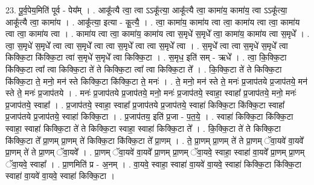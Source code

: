 \documentclass[17pt]{extarticle}
\begin{document}
23. पू॒र्व॒पेय॒मिति॑ पूर्व - पेय᳚म् । . आकू᳚त्यै त्वा॒ त्वा ऽऽकू᳚त्या॒ आकू᳚त्यै त्वा॒ कामा॑य॒ कामा॑य॒ त्वा ऽऽकू᳚त्या॒ आकू᳚त्यै त्वा॒ कामा॑य । . आकू᳚त्या॒ इत्या - कू॒त्यै॒ । . त्वा॒ कामा॑य॒ कामा॑य त्वा त्वा॒ कामा॑य त्वा त्वा॒ कामा॑य त्वा त्वा॒ कामा॑य त्वा । . कामा॑य त्वा त्वा॒ कामा॑य॒ कामा॑य त्वा स॒मृधे॑ स॒मृधे᳚ त्वा॒ कामा॑य॒ कामा॑य त्वा स॒मृधे᳚ । . त्वा॒ स॒मृधे॑ स॒मृधे᳚ त्वा त्वा स॒मृधे᳚ त्वा त्वा स॒मृधे᳚ त्वा त्वा स॒मृधे᳚ त्वा । . स॒मृधे᳚ त्वा त्वा स॒मृधे॑ स॒मृधे᳚ त्वा किक्कि॒टा कि॑क्कि॒टा त्वा॑ स॒मृधे॑ स॒मृधे᳚ त्वा किक्कि॒टा । . स॒मृध॒ इति॑ सम् - ऋधे᳚ । . त्वा॒ कि॒क्कि॒टा कि॑क्कि॒टा त्वा᳚ त्वा किक्कि॒टा ते॑ ते किक्कि॒टा त्वा᳚ त्वा किक्कि॒टा ते᳚ । . कि॒क्कि॒टा ते॑ ते किक्कि॒टा कि॑क्कि॒टा ते॒ मनो॒ मन॑ स्ते किक्कि॒टा कि॑क्कि॒टा ते॒ मनः॑ । . ते॒ मनो॒ मन॑ स्ते ते॒ मनः॑ प्र॒जाप॑तये प्र॒जाप॑तये॒ मन॑ स्ते ते॒ मनः॑ प्र॒जाप॑तये । . मनः॑ प्र॒जाप॑तये प्र॒जाप॑तये॒ मनो॒ मनः॑ प्र॒जाप॑तये॒ स्वाहा॒ स्वाहा᳚ प्र॒जाप॑तये॒ मनो॒ मनः॑ प्र॒जाप॑तये॒ स्वाहा᳚ । . प्र॒जाप॑तये॒ स्वाहा॒ स्वाहा᳚ प्र॒जाप॑तये प्र॒जाप॑तये॒ स्वाहा॑ किक्कि॒टा कि॑क्कि॒टा स्वाहा᳚ प्र॒जाप॑तये प्र॒जाप॑तये॒ स्वाहा॑ किक्कि॒टा । . प्र॒जाप॑तय॒ इति॑ प्र॒जा - प॒त॒ये॒ । . स्वाहा॑ किक्कि॒टा कि॑क्कि॒टा स्वाहा॒ स्वाहा॑ किक्कि॒टा ते॑ ते किक्कि॒टा स्वाहा॒ स्वाहा॑ किक्कि॒टा ते᳚ । . कि॒क्कि॒टा ते॑ ते किक्कि॒टा कि॑क्कि॒टा ते᳚ प्रा॒णम् प्रा॒णम् ते॑ किक्कि॒टा कि॑क्कि॒टा ते᳚ प्रा॒णम् । . ते॒ प्रा॒णम् प्रा॒णम् ते॑ ते प्रा॒णम् ॅवा॒यवे॑ वा॒यवे᳚ प्रा॒णम् ते॑ ते प्रा॒णम् ॅवा॒यवे᳚ । . प्रा॒णम् ॅवा॒यवे॑ वा॒यवे᳚ प्रा॒णम् प्रा॒णम् ॅवा॒यवे॒ स्वाहा॒ स्वाहा॑ वा॒यवे᳚ प्रा॒णम् प्रा॒णम् ॅवा॒यवे॒ स्वाहा᳚ । . प्रा॒णमिति॑ प्र - अ॒नम् । . वा॒यवे॒ स्वाहा॒ स्वाहा॑ वा॒यवे॑ वा॒यवे॒ स्वाहा॑ किक्कि॒टा कि॑क्कि॒टा स्वाहा॑ वा॒यवे॑ वा॒यवे॒ स्वाहा॑ किक्कि॒टा । \newline
\end{document}
